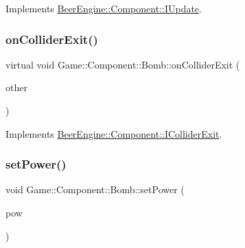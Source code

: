 Implements \mbox{\hyperlink{class_beer_engine_1_1_component_1_1_i_update_a615c127a4729f73713e5eaeee538854b}{Beer\+Engine\+::\+Component\+::\+I\+Update}}.

\mbox{\label{class_game_1_1_component_1_1_bomb_a73e1089e8b6be42c0357beda3ab6ccfa}} 
\subsubsection{\texorpdfstring{on\+Collider\+Exit()}{onColliderExit()}}
{\footnotesize\ttfamily virtual void Game\+::\+Component\+::\+Bomb\+::on\+Collider\+Exit (\begin{DoxyParamCaption}\item[{\mbox{\hyperlink{class_beer_engine_1_1_component_1_1_a_collider}{Beer\+Engine\+::\+Component\+::\+A\+Collider}} $\ast$}]{other }\end{DoxyParamCaption})\hspace{0.3cm}{\ttfamily [virtual]}}



Implements \mbox{\hyperlink{class_beer_engine_1_1_component_1_1_i_collider_exit_a3669477d0003535fbe0411449efc69e9}{Beer\+Engine\+::\+Component\+::\+I\+Collider\+Exit}}.

\mbox{\label{class_game_1_1_component_1_1_bomb_a3432430350d557ef1b7d9ac0339b659a}} 
\subsubsection{\texorpdfstring{set\+Power()}{setPower()}}
{\footnotesize\ttfamily void Game\+::\+Component\+::\+Bomb\+::set\+Power (\begin{DoxyParamCaption}\item[{float}]{pow }\end{DoxyParamCaption})}

\mbox{\label{class_game_1_1_component_1_1_bomb_a74e5f8e628a9d434f0faf91273f33990}} 
